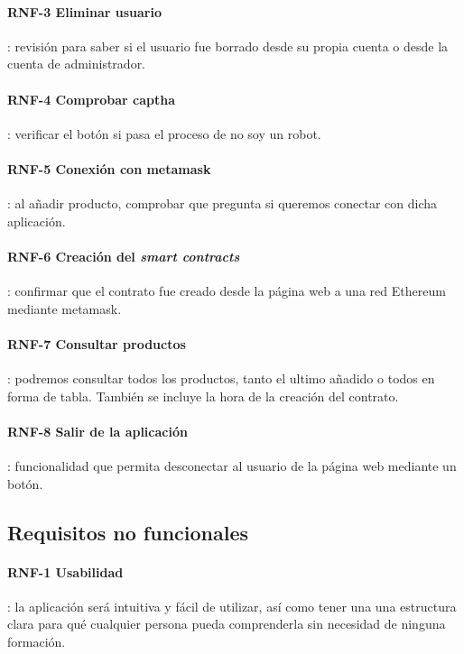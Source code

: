 \paragraph{RNF-3 Eliminar usuario}: revisión para saber si el usuario fue borrado desde su propia cuenta o desde la cuenta de administrador.

\paragraph{RNF-4 Comprobar captha}: verificar el botón si pasa el proceso de no soy un robot.

\paragraph{RNF-5 Conexión con metamask}: al añadir producto, comprobar que pregunta si queremos conectar con dicha aplicación.

\paragraph{RNF-6 Creación del \textit{smart contracts}}: confirmar que el contrato  fue creado desde la página web a una red Ethereum mediante metamask.

\paragraph{RNF-7 Consultar productos}: podremos consultar todos los productos, tanto el ultimo añadido o todos en forma de tabla. También se incluye la hora de la creación del contrato. 

\paragraph{RNF-8 Salir de la aplicación}: funcionalidad que permita desconectar al usuario de la página web mediante un botón.

\subsection{Requisitos no funcionales}
\paragraph{RNF-1 Usabilidad}: la aplicación será intuitiva y fácil de utilizar, así como tener una una estructura clara para qué cualquier persona pueda comprenderla sin necesidad de ninguna formación.

